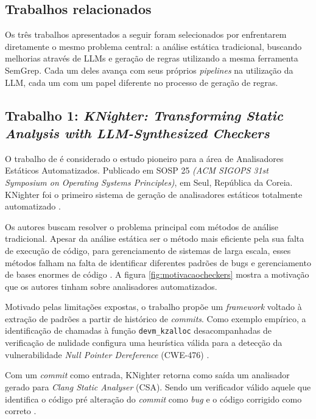 \documentclass[
    12pt,                %
    openright,           %
    oneside,             %
    a4paper,             %
    english,             %
    brazil               %
]{abntex2}
\begin{document}
\begin{itemize}
\section{Trabalhos relacionados}
\label{sec:trabalhosrelacionados}

Os três trabalhos apresentados a seguir foram selecionados por enfrentarem diretamente o mesmo problema central: a análise estática tradicional, buscando melhorias através de LLMs e geração de regras utilizando a mesma ferramenta SemGrep.
Cada um deles avança com seus próprios \textit{pipelines} na utilização da LLM, cada um com um papel diferente no processo de geração de regras.

\subsection{Trabalho 1: \textit{KNighter: Transforming Static Analysis with LLM-Synthesized Checkers} \cite{yang2025knighter}}
\par
O trabalho de  é considerado o estudo pioneiro para a área de Analisadores Estáticos Automatizados.
Publicado em SOSP 25 \textit{(ACM SIGOPS 31st Symposium on Operating Systems Principles)}, em Seul, República da Coreia.
KNighter foi o primeiro sistema de geração de analisadores estáticos totalmente automatizado \cite{yang2025knighter}.
\par
Os autores buscam resolver o problema principal com métodos de análise tradicional.
Apesar da análise estática ser o método mais eficiente pela sua falta de execução de código, para gerenciamento de sistemas de larga escala, esses métodos falham na falta de identificar diferentes padrões de bugs e gerenciamento de bases enormes de código \cite{yang2025knighter}.
A figura \ref{fig:motivacaocheckers} mostra a motivação que os autores tinham sobre analisadores automatizados.
\par
Motivado pelas limitações expostas, o trabalho propõe um \textit{framework} voltado à extração de padrões a partir de histórico de \textit{commits}.
Como exemplo empírico, a identificação de chamadas à função \texttt{devm\_kzalloc} desacompanhadas de verificação de nulidade configura uma heurística válida para a detecção da vulnerabilidade \textit{Null Pointer Dereference} (CWE-476) \cite{yang2025knighter}.
\par
Com um \textit{commit} como entrada, KNighter retorna como saída um analisador gerado para \textit{Clang Static Analyser} (CSA). Sendo um verificador válido aquele que identifica o código pré alteração do \textit{commit} como \textit{bug} e o código corrigido como correto \cite{yang2025knighter}.


\end{itemize}
\end{document}
